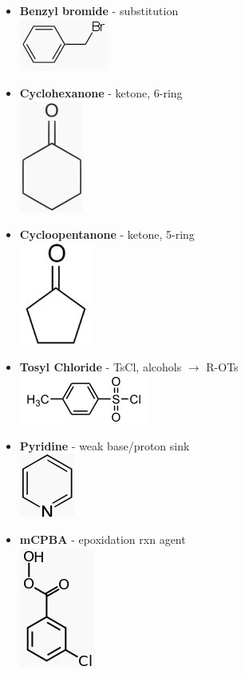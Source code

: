\documentclass[10pt,landscape]{article}
\begin{document}
\begin{multicols*}{3}
\begin{scriptsize}
\begin{itemize}
    \item \textbf{Benzyl bromide} - substitution\\
      \includegraphics[scale=0.25]{allowed/benzylbr.jpg}
    \item \textbf{Cyclohexanone} - ketone, 6-ring\\
      \includegraphics[scale=0.25]{allowed/cyclohexanone.jpg}
    \item \textbf{Cycloopentanone} - ketone, 5-ring\\
      \includegraphics[scale=0.25]{allowed/cyclopentanone.jpg}
    \item \textbf{Tosyl Chloride} - TsCl, alcohols $\rightarrow$ R-OTs\\
      \includegraphics[scale=0.25]{allowed/TsCl.jpg}
    \item \textbf{Pyridine} - weak base/proton sink\\
      \includegraphics[scale=0.25]{allowed/pyridine.jpg}
    \item \textbf{mCPBA} - epoxidation rxn agent\\
      \includegraphics[scale=0.25]{allowed/mCPBA.jpg}

\end{itemize}
\end{scriptsize}
\end{multicols*}
\end{document}
